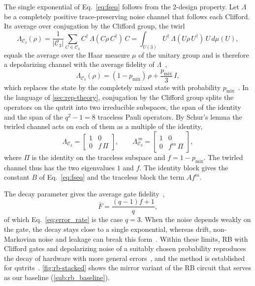 The single exponential of Eq.~\eqref{eq:fseq} follows from the 2-design property. Let $\Lambda$ be a completely positive trace-preserving noise channel that follows each Clifford. Its average over conjugation by the Clifford group, the twirl
\begin{equation}
    \Lambda_{\mathcal{C}_3}(\rho)
    = \frac{1}{|\mathcal{C}_3|}\sum_{C\in\mathcal{C}_3}
    C^\dagger\,\Lambda(C\rho\, C^\dagger)\,C
    = \int_{U(3)} U^\dagger\,\Lambda(U\rho\, U^\dagger)\,U\,
    d\mu(U),
\label{eq:clifford-twirl}
\end{equation}
equals the average over the Haar measure $\mu$ of the unitary group and is therefore a depolarizing channel with the average fidelity of $\Lambda$~\cite{Emerson2005,Dankert2009,Gross2007,Magesan2011PRL},
\begin{equation}
    \Lambda_{\mathcal{C}_3}(\rho) = (1-p_{\mathrm{mix}})\,\rho+\frac{p_{\mathrm{mix}}}{3}\,I ,
    \label{eq:1-depol}
\end{equation}
which replaces the state by the completely mixed state with probability $p_{\mathrm{mix}}$~\cite{NielsenChuang2010}. In the language of \autoref{sec:rep-theory}, conjugation by the Clifford group splits the operators on the qutrit into two irreducible subspaces, the span of the identity and the span of the $q^2 - 1 = 8$ traceless Pauli operators. By Schur's lemma the twirled channel acts on each of them as a multiple of the identity,
\begin{equation}
    \Lambda_{\mathcal{C}_3} =
    \begin{bmatrix}
    1 & 0 \\
    0 & f\,\Pi
    \end{bmatrix},
    \qquad
    \Lambda_{\mathcal{C}_3}^{\,m} =
    \begin{bmatrix}
    1 & 0 \\
    0 & f^{m}\,\Pi
    \end{bmatrix},
\label{eq:twirl_irrep}
\end{equation}
where $\Pi$ is the identity on the traceless subspace and $f = 1 - p_{\mathrm{mix}}$. The twirled channel thus has the two eigenvalues $1$ and $f$. The identity block gives the constant $B$ of Eq.~\eqref{eq:fseq} and the traceless block the term $A f^m$.

The decay parameter gives the average gate fidelity~\cite{Nielsen2002,Magesan2012PRA},
\begin{equation}
\bar{F} = \frac{(q-1)f + 1}{q} ,
\label{eq:fbar}
\end{equation}
of which Eq.~\eqref{eq:error_rate} is the case $q = 3$. When the noise depends weakly on the gate, the decay stays close to a single exponential, whereas drift, non-Markovian noise and leakage can break this form~\cite{Emerson2005,Wallman2018}. Within these limits, RB with Clifford gates and depolarizing noise of a suitably chosen probability reproduces the decay of hardware with more general errors~\cite{Magesan2011PRL,Proctor2019DRB}, and the method is established for qutrits~\cite{Morvan2021}. \autoref{fig:rb-stacked} shows the mirror variant of the RB circuit that serves as our baseline (\autoref{sub:rb_baseline}).

